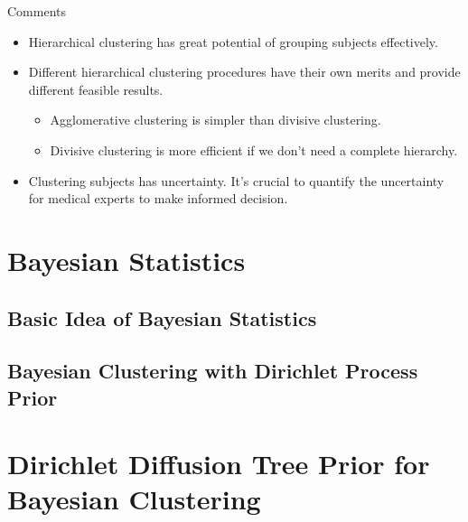 \documentclass{beamer}
\begin{document}
	\begin{frame}{Comments}
		\begin{itemize}
			\item Hierarchical clustering has great potential of grouping subjects effectively.
			\item Different hierarchical clustering procedures have their own merits and provide different feasible results.
			\begin{itemize}
				\item Agglomerative clustering is simpler than divisive clustering.
				\item Divisive clustering is more efficient if we don't need a complete hierarchy.
			\end{itemize}
			\item Clustering subjects has uncertainty. It's crucial to quantify the uncertainty for medical experts to make informed decision.
		\end{itemize}
	\end{frame}
	
	\section{Bayesian Statistics}
	\subsection{Basic Idea of Bayesian Statistics}
		\begin{frame}
		\tableofcontents
		[
		currentsection,
		currentsubsection,
		subsectionstyle=show/shaded/hide
		]
	\end{frame}


	\subsection{Bayesian Clustering with Dirichlet Process Prior}
		\begin{frame}
		\tableofcontents
		[
		currentsection,
		currentsubsection,
		subsectionstyle=show/shaded/hide
		]
	\end{frame}

	\section{Dirichlet Diffusion Tree Prior for Bayesian Clustering}	
		\begin{frame}
		\tableofcontents
		[
		currentsection,
		currentsubsection,
		subsectionstyle=show/shaded/hide
		]
	\end{frame}
\end{document}
